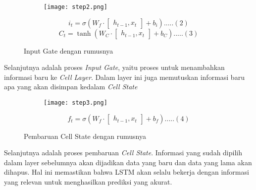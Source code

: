 \begin{subs}
	\begin{figure}[H]
		\centering
		\begin{subfigure}[b]{0.45\textwidth}
			\centering
			\texttt{[image: step2.png]} %
		\end{subfigure}
		\hfill
		\begin{subfigure}[b]{0.5\textwidth}
			\centering
			\[
				i_t = \sigma \left( W_f \cdot \begin{bmatrix} h_{t-1},x_t \end{bmatrix} + b_i \right)  ..... (2)
			\]
			\[
				C_t = \tanh \left( W_C \cdot \begin{bmatrix} h_{t-1},x_t \end{bmatrix} + b_C \right) ..... (3)
			\]
		\end{subfigure}
		\caption{Input Gate dengan rumusnya}
	\end{figure}
	Selanjutnya adalah proses \textit{Input Gate}, yaitu proses untuk menambahkan informasi baru ke \textit{Cell Layer}. Dalam layer ini juga memutuskan informasi baru apa yang akan disimpan kedalam \textit{Cell State}

	\begin{figure}[H]
		\centering
		\begin{subfigure}[b]{0.45\textwidth}
			\centering
			\texttt{[image: step3.png]}
		\end{subfigure}
		\hfill
		\begin{subfigure}[b]{0.5\textwidth}
			\centering
			\[
				f_t = \sigma \left( W_f \cdot \begin{bmatrix} h_{t-1},x_t \end{bmatrix} + b_f \right) ..... (4)
			\]
		\end{subfigure}
		\caption{Pembaruan Cell State dengan rumusnya}
	\end{figure}
	Selanjutnya adalah proses pembaruan \textit{Cell State}. Informasi yang sudah dipilih dalam layer sebelumnya akan dijadikan data yang baru dan data yang lama akan dihapus. Hal ini memastikan bahwa LSTM akan selalu bekerja dengan informasi yang relevan untuk menghasilkan prediksi yang akurat.


\end{subs}
